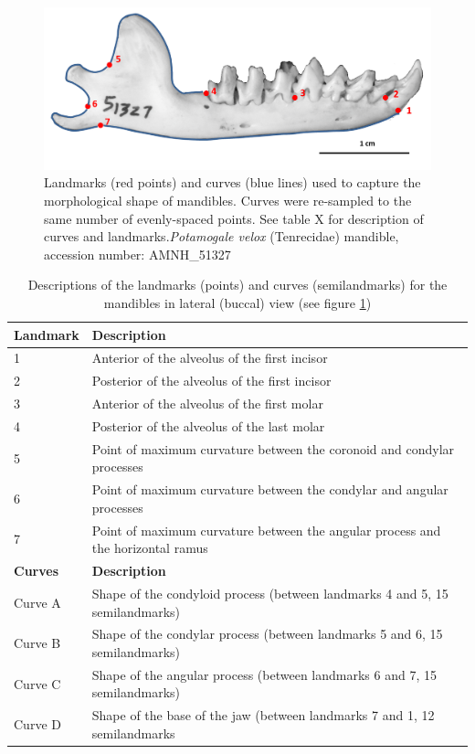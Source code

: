\documentclass[12pt,a4paper]{article}
\begin{document}
\begin{figure}[H]
\centering
\includegraphics[width=1\linewidth]{AMNH_51327_landmarksdiagram.png}

\caption{Landmarks (red points) and curves (blue lines) used to capture the morphological shape of mandibles. Curves were re-sampled to the same number of evenly-spaced points. See table X for description of curves and landmarks.\textit{Potamogale velox} (Tenrecidae) mandible, accession number: AMNH\_51327}
\label{mandslandmarks}
\end{figure}


\begin{table}[H]			
\centering
\caption{Descriptions of the landmarks (points) and curves (semilandmarks) for the mandibles in lateral (buccal) view (see figure \ref{mandslandmarks})}
\begin{tabular}[t]{l l}		
\hline
\textbf{Landmark} & \textbf{Description} \\
\hline
1 & Anterior of the alveolus of the first incisor \\
2 & Posterior of the alveolus of the first incisor \\
3 &	Anterior of the alveolus of the first molar \\
4 & Posterior of the alveolus of the last molar \\
5 & Point of maximum curvature between the coronoid and condylar processes \\
6 & Point of maximum curvature between the condylar and angular processes  \\
7 &	Point of maximum curvature between the angular process and the horizontal ramus \\

\hline
\textbf{Curves} & \textbf{Description}\\
\hline

Curve A & Shape of the condyloid process (between landmarks 4 and 5, 15 semilandmarks) \\
Curve B & Shape of the condylar process (between landmarks 5 and 6, 15 semilandmarks) \\
Curve C & Shape of the angular process (between landmarks 6 and 7, 15 semilandmarks) \\
Curve D & Shape of the base of the jaw (between landmarks 7 and 1, 12 semilandmarks \\
\hline
\end{tabular}
\label{mandslanddesc} %
\end{table}
 
\end{document}
